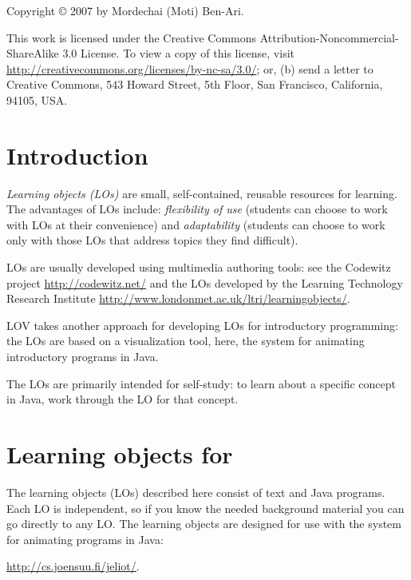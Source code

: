 \maketitle
\thispagestyle{empty}

\vfill

Copyright \copyright{} 2007 by Mordechai (Moti) Ben-Ari.

This work is licensed under the Creative Commons
Attribution-Noncommercial-ShareAlike 3.0 License. 
To view a copy of this license, 
visit \url{http://creativecommons.org/licenses/by-nc-sa/3.0/}; 
or, (b) send a letter to Creative Commons, 
543 Howard Street, 5th Floor, San Francisco, California, 94105, USA.

\clearpage

\section*{Introduction}
\emph{Learning objects (LOs)} are small, self-contained, reusable resources for 
learning. The advantages of LOs include: \emph{flexibility of 
use} (students can choose to work with LOs at their convenience) and 
\emph{adaptability} (students can choose to work only with those LOs that 
address topics they find difficult).

LOs are usually developed using multimedia authoring tools: see
the Codewitz project \url{http://codewitz.net/} and the LOs
developed by the Learning Technology Research Institute 
\url{http://www.londonmet.ac.uk/ltri/learningobjects/}.

LOV takes another approach for developing LOs for introductory programming:
the LOs are based on a visualization tool, here, the \jel{} system for animating
introductory programs in Java.

The LOs are primarily intended for self-study: to learn about a specific
concept in Java, work through the LO for that concept.

\section*{Learning objects for \jel{}}

The learning objects (LOs) described here consist of text and Java 
programs. Each LO is independent, so if you know the needed background 
material you can go directly to any LO. The learning objects are designed
for use with the \jel{} system for animating programs in Java:
\begin{center}
\url{http://cs.joensuu.fi/jeliot/}.
\end{center}

